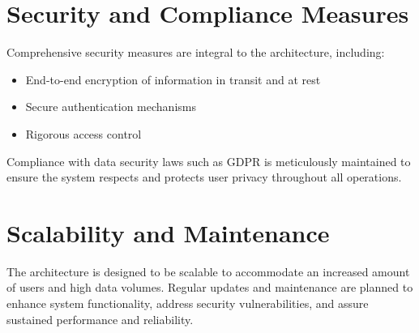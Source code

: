 \section{Security and Compliance Measures}
Comprehensive security measures are integral to the architecture, including:

\begin{itemize}
    \item End-to-end encryption of information in transit and at rest
    \item Secure authentication mechanisms
    \item Rigorous access control
\end{itemize}

Compliance with data security laws such as GDPR is meticulously maintained to
ensure the system respects and protects user privacy throughout all operations.

\section{Scalability and Maintenance}
The architecture is designed to be scalable to accommodate an increased amount of
users and high data volumes. Regular updates and maintenance are planned to
enhance system functionality, address security vulnerabilities, and assure
sustained performance and reliability.